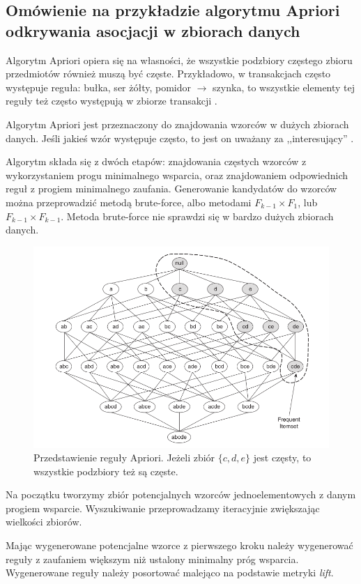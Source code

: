 \documentclass[wi]{zut}
\begin{document}
\subsection{Omówienie na przykładzie algorytmu Apriori odkrywania asocjacji w zbiorach danych}

Algorytm Apriori opiera się na własności, że wszystkie podzbiory częstego zbioru przedmiotów również muszą być częste. Przykładowo, w transakcjach często występuje reguła: bułka, ser żółty, pomidor $\rightarrow$ szynka, to wszystkie elementy tej reguły też często występują w zbiorze transakcji \cite{Kolodziejczyk2020}.

Algorytm Apriori jest przeznaczony do znajdowania wzorców w dużych zbiorach danych. Jeśli jakieś wzór występuje często, to jest on uważany za ,,interesujący'' \cite{Kolodziejczyk2020}.

Algorytm składa się z dwóch etapów: znajdowania częstych wzorców z wykorzystaniem progu minimalnego wsparcia, oraz znajdowaniem odpowiednich reguł z progiem minimalnego zaufania. Generowanie kandydatów do wzorców można przeprowadzić metodą brute-force, albo metodami $F_{k-1} \times F_1$, lub $F_{k-1} \times F_{k-1}$. Metoda brute-force nie sprawdzi się w bardzo dużych zbiorach danych.

\begin{figure}[H]
    \centering
    \includegraphics[width=0.5\linewidth]{images/apriori.png}
    \caption{Przedstawienie reguły Apriori. Jeżeli zbiór $\{c, d, e\}$ jest częsty, to wszystkie podzbiory też są częste.}
    \label{fig:apriori}
\end{figure}


Na początku tworzymy zbiór potencjalnych wzorców jednoelementowych z danym progiem wsparcie. Wyszukiwanie przeprowadzamy iteracyjnie zwiększając wielkości zbiorów. 

Mając wygenerowane potencjalne wzorce z pierwszego kroku należy wygenerować reguły z zaufaniem większym niż ustalony minimalny próg wsparcia. Wygenerowane reguły należy posortować malejąco na podstawie metryki \emph{lift}.
\end{document}
